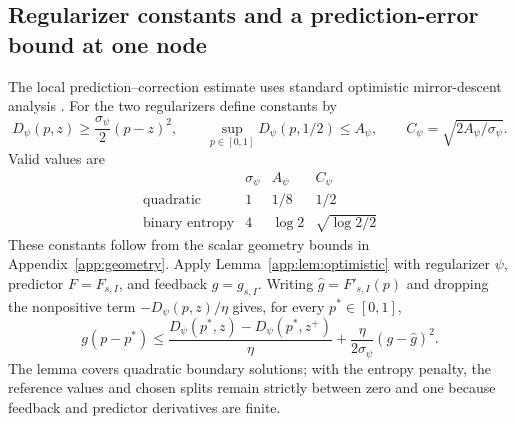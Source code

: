 \documentclass[11pt]{article}
\theoremstyle{plain}
\theoremstyle{remark}
\numberwithin{equation}{section}
\begin{document}
\subsection{Regularizer constants and a prediction-error bound at one node}
The local prediction--correction estimate uses standard optimistic
mirror-descent analysis \cite{RakhlinSridharan2013,flaspohler2021optimism}.
For the two regularizers define constants by
\begin{equation}\label{ch6:eq:geometry}
 {D_\psi}(p,z)\ge\frac{\sigma_\psi}{2}(p-z)^2,\qquad
 \sup_{p\in[0,1]}{D_\psi}(p,1/2)\le{A_\psi},\qquad
 {C_\psi}=\sqrt{2{A_\psi}/\sigma_\psi}.
\end{equation}
Valid values are
\begin{equation}\label{ch6:eq:constants}
 \begin{array}{c|ccc}
 &\sigma_\psi&{A_\psi}&{C_\psi}\\\hline
 \text{quadratic}&1&1/8&1/2\\
 \text{binary entropy}&4&\log2&\sqrt{\log2/2}
 \end{array}
\end{equation}
These constants follow from the scalar geometry bounds in
Appendix~\ref{app:geometry}.
Apply Lemma~\ref{app:lem:optimistic} with regularizer
$\psi$, predictor $F=F_{s,I}$, and feedback $g=g_{s,I}$.
Writing $\widehat g=F'_{s,I}(p)$ and dropping the nonpositive term
$-D_\psi(p,z)/\eta$ gives, for every $p^*\in[0,1]$,
\begin{equation}\label{ch6:eq:one-step}
 g(p-p^*)\le
 \frac{D_\psi(p^*,z)-D_\psi(p^*,z^+)}\eta
 +\frac\eta{2\sigma_\psi}(g-\widehat g)^2.
\end{equation}
The lemma covers quadratic boundary solutions; with the entropy penalty, the reference values and chosen splits
remain strictly between zero and one because feedback and predictor derivatives are finite.
\end{document}
